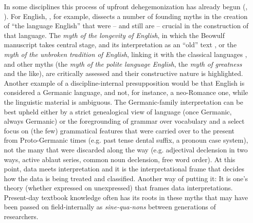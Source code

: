 \documentclass[output=paper]{langscibook}
\begin{document}
In some disciplines this process of upfront dehegemonization has already begun (\citealt{Hudleyetal2024}, \citealt{Costa2024}). For English, \citet{Watts2011}, for example, dissects a number of founding myths in the creation of “the language English” that were – and still are – crucial in the construction of that language. The \textit{myth of the longevity of English}, in which the Beowulf manuscript takes central stage, and its interpretation as an “old” text \citep[28--52]{Watts2011}, or the \textit{myth of the unbroken tradition of English}, linking it with the classical languages \citep[53--82]{Watts2011}, and other myths (the \textit{myth of the polite language English}, the \textit{myth of greatness} and the like), are critically assessed and their constructive nature is highlighted. Another example of a discipline-internal presupposition would be that English is considered a Germanic language, and not, for instance, a neo-Romance one, while the linguistic material is ambiguous. The Germanic-family interpretation can be best upheld either by a strict genealogical view of language (once Germanic, always Germanic) or the foregrounding of grammar over vocabulary and a select focus on (the few) grammatical features that were carried over to the present from Proto-Germanic times (e.g. past tense dental suffix, a pronoun case system), not the many that were discarded along the way (e.g. adjectival declension in two ways, active ablaut series, common noun declension, free word order). At this point, data meets interpretation and it is the interpretational frame that decides how the data is being treated and classified. Another way of putting it: It is one’s theory (whether expressed on unexpressed) that frames data interpretations. Present-day textbook knowledge often has its roots in these myths that may have been passed on field-internally as \textit{sine-qua-nons} between generations of researchers.
\end{document}

